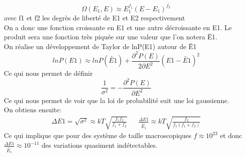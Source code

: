 $$\Omega (E_1,E) \approx E_1^{f_1} (E-E_1)^{f_2}  $$
avec f1 et f2 les degrès de liberté de E1 et E2 respectivement \\
On a donc une fonction croissante en E1 et une autre décroissante en E1. Le produit sera une fonction très piquée sur une valeur que l'on notera \~{E1}.\\
On réalise un développement de Taylor de lnP(E1) autour de \~{E1}
$$ lnP(E1) \approx lnP(\tilde{E1}) + \frac{\partial^2 P(E)}{2 \partial E^2} (E1-\tilde{E1})^2$$
Ce qui nous permet de définir 
$$ \frac{1}{\sigma^2}=- \frac{\partial^2 P(E)}{\partial E^2}$$
Ce qui nous permet de voir que la loi de probabilité suit une loi gaussienne. \\
On obtiens ensuite:
\begin{align*}
\Delta{E1}=\sqrt{\sigma^2}\approx kT\sqrt{\frac{f_1 f_2}{f_1 + f_2}} && \frac{\Delta{E1}}{\tilde{E_1}}\approx kT\sqrt{\frac{f_2}{f_1(f_1 + f_2)}}
\end{align*}
Ce qui implique que pour des système de taille macroscopiques $f\approx 10^{23}$ et donc $\frac{\Delta{E1}}{\tilde{E_1}}\approx 10^{-11}$ des variations quasiment indétectables.